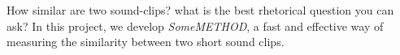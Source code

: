 How similar are two sound-clips?
what is the best rhetorical question you can ask?
In this project, we develop {\em SomeMETHOD},
a fast and effective way of measuring the similarity
between two short sound clips.
